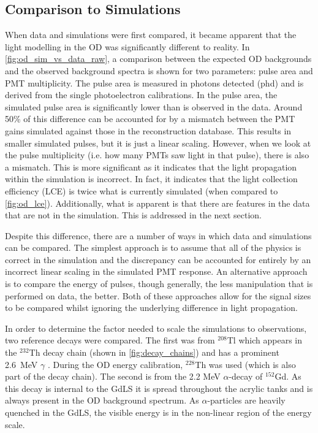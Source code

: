 

\subsection{Comparison to Simulations}
\par

When data and simulations were first compared, it became apparent that the light modelling in the OD was significantly different to reality.
In \autoref{fig:od_sim_vs_data_raw}, a comparison between the expected OD backgrounds and the observed background spectra is shown for two parameters: pulse area and PMT multiplicity.
The pulse area is measured in photons detected (phd) and is derived from the single photoelectron calibrations.
In the pulse area, the simulated pulse area is significantly lower than is observed in the data.
Around 50\% of this difference can be accounted for by a mismatch between the PMT gains simulated against those in the reconstruction database.
This results in smaller simulated pulses, but it is just a linear scaling.
However, when we look at the pulse multiplicity (i.e. how many PMTs saw light in that pulse), there is also a mismatch.
This is more significant as it indicates that the light propagation within the simulation is incorrect.
In fact, it indicates that the light collection efficiency (LCE) is twice what is currently simulated (when compared to \autoref{fig:od_lce}).
Additionally, what is apparent is that there are features in the data that are not in the simulation. 
This is addressed in the next section.



\par
Despite this difference, there are a number of ways in which data and simulations can be compared.
The simplest approach is to assume that all of the physics is correct in the simulation and the discrepancy can be accounted for entirely by an incorrect linear scaling in the simulated PMT response.
An alternative approach is to compare the energy of pulses, though generally, the less manipulation that is performed on data, the better.
Both of these approaches allow for the signal sizes to be compared whilst ignoring the underlying difference in light propagation.

\par
In order to determine the factor needed to scale the simulations to observations, two reference decays were compared.
The first was from ${}^{208}$Tl which appears in the ${}^{232}$Th decay chain (shown in \autoref{fig:decay_chains}) and has a prominent 2.6~MeV $\gamma$ \cite{radon_chains_ref}.
During the OD energy calibration, ${}^{228}$Th was used (which is also part of the decay chain).
The second is from the 2.2 MeV $\alpha$-decay of ${}^{152}$Gd.
As this decay is internal to the GdLS it is spread throughout the acrylic tanks and is always present in the OD background spectrum.
As $\alpha$-particles are heavily quenched in the GdLS, the visible energy is in the non-linear region of the energy scale.

